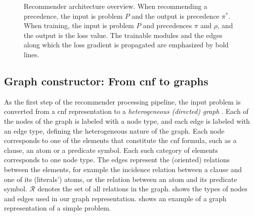\begin{figure}[ht]

\fi

\caption{Recommender architecture overview.
When recommending a precedence, the input is problem $P$ and the output is precedence $\pi^*$.
When training, the input is problem $P$ and precedences $\pi$ and $\rho$,
and the output is the loss value.
The trainable modules and the edges along which the loss gradient is propagated are emphasized by bold lines.}
\label{fig:architecture}
\end{figure}

\subsection{Graph constructor: From \gls{cnf} to graphs}
\label{sec:graphifier}

As the first step of the recommender processing pipeline,
the input problem is converted from a \gls{cnf} representation
to a \emph{heterogeneous (directed) graph} \cite{Zhou2018}.
Each of the nodes of the graph is labeled with a node type,
and each edge is labeled with an edge type,
defining the heterogeneous nature of the graph.
Each node corresponds to one of the elements that constitute the \gls{cnf} formula,
such as a clause, an atom or a predicate symbol.
Each such category of elements corresponds to one node type.
The edges represent the (oriented) relations between the elements,
for example the incidence relation between a clause and one of its (literals') atoms,
or the relation between an atom and its predicate symbol.
$\mathcal{R}$ denotes the set of all relations in the graph.
 shows the types of nodes and edges used in our graph representation.
 shows an example of a graph representation of a simple problem.

